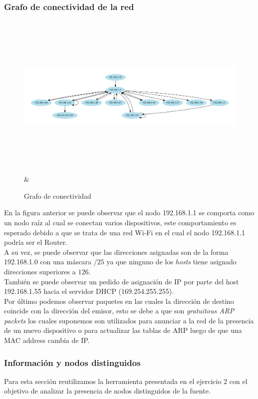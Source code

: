 \subsubsection{Grafo de conectividad de la red}


\begin{figure}[H]
   \centering
       \includegraphics[page=1,height=8cm ,width=1.08\textwidth]{../img/red-Empresa} &
 \caption{Grafo de conectividad}
 \label{fig:Test}
\end{figure}


 En la figura anterior se puede observar que el nodo 192.168.1.1 se comporta como un nodo raíz al cual se conectan varios dispositivos, este comportamiento es esperado debido a que se trata de una red Wi-Fi en el cual el nodo 192.168.1.1 podría ser el Router. \\

A su vez, se puede observar que las direcciones asignadas son de la forma 192.168.1.0 con una máscara $/25$ ya que ninguno de los \emph{hosts} tiene asignado direcciones superiores a $126$. \\

También se puede observar un pedido de asignación de IP por parte del host 192.168.1.55 hacia el servidor DHCP (169.254.255.255).\\

Por último podemos observar paquetes en las cuales la dirección de destino coincide con la dirección del emisor, esto se debe a que son \emph{gratuitous ARP packets} los cuales suponemos son utilizados para anunciar a la red de la presencia de un nuevo dispositivo o para actualizar las tablas de ARP luego de que una MAC address cambia de IP.


 \subsubsection{Información y nodos distinguidos}
 Para esta sección reutilizamos la herramienta presentada en el ejercicio 2 con el objetivo de analizar la presencia de nodos distinguidos de la fuente. \\

